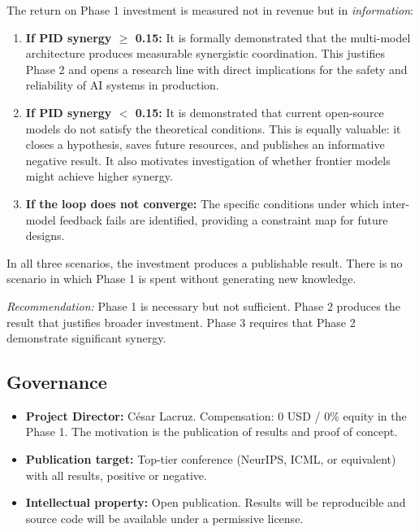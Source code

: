 \documentclass[11pt,a4paper]{article}
\theoremstyle{remark}
\begin{document}
The return on Phase 1 investment is measured not in revenue but in \emph{information}:

\begin{enumerate}
  \item \textbf{If PID synergy $\geq$ 0.15:} It is formally demonstrated that the multi-model architecture produces measurable synergistic coordination. This justifies Phase 2 and opens a research line with direct implications for the safety and reliability of AI systems in production.
  
  \item \textbf{If PID synergy $<$ 0.15:} It is demonstrated that current open-source models do not satisfy the theoretical conditions. This is equally valuable: it closes a hypothesis, saves future resources, and publishes an informative negative result. It also motivates investigation of whether frontier models might achieve higher synergy.
  
  \item \textbf{If the loop does not converge:} The specific conditions under which inter-model feedback fails are identified, providing a constraint map for future designs.
\end{enumerate}

In all three scenarios, the investment produces a publishable result. There is no scenario in which Phase 1 is spent without generating new knowledge.

\emph{Recommendation:} Phase 1 is necessary but not sufficient. Phase 2 produces the result that justifies broader investment. Phase 3 requires that Phase 2 demonstrate significant synergy.

\subsection{Governance}

\begin{itemize}
  \item \textbf{Project Director:} C\'esar Lacruz. Compensation: 0 USD / 0\% equity in the Phase 1. The motivation is the publication of results and proof of concept.
  \item \textbf{Publication target:} Top-tier conference (NeurIPS, ICML, or equivalent) with all results, positive or negative.
  \item \textbf{Intellectual property:} Open publication. Results will be reproducible and source code will be available under a permissive license.
\end{itemize}
\end{document}
